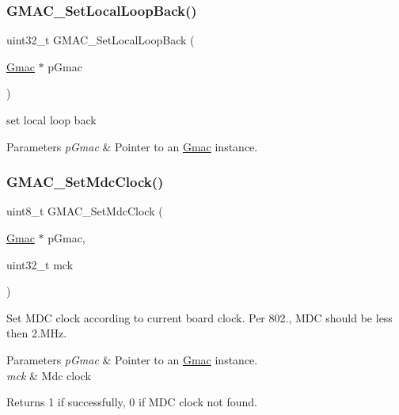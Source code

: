 \subsubsection{\texorpdfstring{GMAC\_SetLocalLoopBack()}{GMAC\_SetLocalLoopBack()}}
{\footnotesize\ttfamily uint32\+\_\+t G\+M\+A\+C\+\_\+\+Set\+Local\+Loop\+Back (\begin{DoxyParamCaption}\item[{\mbox{\hyperlink{structGmac}{Gmac}} $\ast$}]{p\+Gmac }\end{DoxyParamCaption})}



set local loop back 


\begin{DoxyParams}{Parameters}
{\em p\+Gmac} & Pointer to an \mbox{\hyperlink{structGmac}{Gmac}} instance. \\
\hline
\end{DoxyParams}
\mbox{\label{group__gmac__defines_ga56d0b7353ef8be740202f6e5a902ca6a}} 
\subsubsection{\texorpdfstring{GMAC\_SetMdcClock()}{GMAC\_SetMdcClock()}}
{\footnotesize\ttfamily uint8\+\_\+t G\+M\+A\+C\+\_\+\+Set\+Mdc\+Clock (\begin{DoxyParamCaption}\item[{\mbox{\hyperlink{structGmac}{Gmac}} $\ast$}]{p\+Gmac,  }\item[{uint32\+\_\+t}]{mck }\end{DoxyParamCaption})}



Set M\+DC clock according to current board clock. Per 802., M\+DC should be less then 2.\+M\+Hz. 


\begin{DoxyParams}{Parameters}
{\em p\+Gmac} & Pointer to an \mbox{\hyperlink{structGmac}{Gmac}} instance. \\
\hline
{\em mck} & Mdc clock \\
\hline
\end{DoxyParams}
\begin{DoxyReturn}{Returns}
1 if successfully, 0 if M\+DC clock not found. 
\end{DoxyReturn}
\mbox{\label{group__gmac__defines_gab6728c6253143037bbc9c30befe81c19}} 
